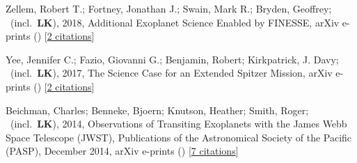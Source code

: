 \item[{\color{numcolor}\scriptsize3}] Zellem, Robert T.; Fortney, Jonathan J.; Swain, Mark R.; Bryden, Geoffrey; \etal\ (incl.\ \textbf{LK}), 2018, Additional Exoplanet Science Enabled by FINESSE, arXiv e-prints () [\href{https://ui.adsabs.harvard.edu/abs/2018arXiv180307163Z}{2 citations}]

\item[{\color{numcolor}\scriptsize2}] Yee, Jennifer C.; Fazio, Giovanni G.; Benjamin, Robert; Kirkpatrick, J. Davy; \etal\ (incl.\ \textbf{LK}), 2017, The Science Case for an Extended Spitzer Mission, arXiv e-prints () [\href{https://ui.adsabs.harvard.edu/abs/2017arXiv171004194Y}{2 citations}]

\item[{\color{numcolor}\scriptsize1}] Beichman, Charles; Benneke, Bjoern; Knutson, Heather; Smith, Roger; \etal\ (incl.\ \textbf{LK}), 2014, Observations of Transiting Exoplanets with the James Webb Space Telescope (JWST), Publications of the Astronomical Society of the Pacific (PASP), December 2014, arXiv e-prints () [\href{https://ui.adsabs.harvard.edu/abs/2014arXiv1411.1754B}{7 citations}]